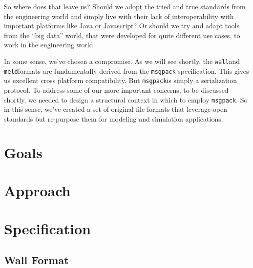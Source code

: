 \documentclass[11pt,a4paper,twocolumn]{article}
\newcommand{\wall}{\texttt{wall}}
\newcommand{\meld}{\texttt{meld}}
\newcommand{\msgpack}{\texttt{msgpack}}
\begin{document}
So where does that leave us?  Should we adopt the tried and true
standards from the engineering world and simply live with their lack
of interoperability with important platforms like Java or Javascript?
Or should we try and adapt tools from the ``big data'' world, that
were developed for quite different use cases, to work in the
engineering world.

In some sense, we've chosen a compromise.  As we will see shortly, the
\wall and \meld formats are fundamentally derived from the
\msgpack\cite{msgpack} specification.  This gives us excellent cross
platform compatibility.  But \msgpack is simply a serialization
protocol.  To address some of our more important concerns, to be
discussed shortly, we needed to design a structural context in which
to employ \msgpack. So in this sense, we've created a set of original
file formats that leverage open standards but re-purpose them for
modeling and simulation applications.

\section{Goals}
\label{sec:background}




\section{Approach}


\section{Specification}
\label{sec:spec}

\subsection{Wall Format}
\label{sec:wall_spec}
\end{document}
